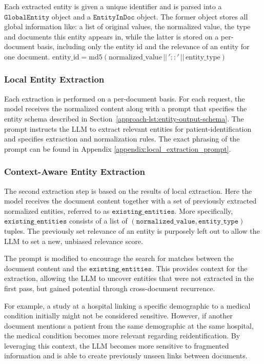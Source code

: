 Each extracted entity is given a unique identifier and is parsed into a $\texttt{GlobalEntity}$ object and a $\texttt{EntityInDoc}$ object. The former object stores all global information like: a list of original values, the normalized value, the type and documents this entity appears in, while the latter is stored on a per-document basis, including only the entity id and the relevance of an entity for one document.
\(\text{entity\_id} = \text{md5}(\text{normalized\_value} \,||\, '::' \,||\, \text{entity\_type})\)


\subsubsection{Local Entity Extraction}
Each extraction is performed on a per-document basis. For each request, the model receives the normalized content along with a prompt that specifies the entity schema described in Section~\ref{approach-lst:entity-output-schema}. The prompt instructs the LLM to extract relevant entities for patient-identification and specifies extraction and normalization rules. The exact phrasing of the prompt can be found in Appendix \ref{appendix:local_extraction_prompt}.


\subsubsection{Context-Aware Entity Extraction}\label{approach-subsubsec:context_extract}
The second extraction step is based on the results of local extraction. Here the model receives the document content together with a set of previously extracted normalized entities, referred to as $\texttt{existing\_entities}$. More specifically, $\texttt{existing\_entities}$ consists of a list of $(\texttt{normalized\_value}, \texttt{entity\_type})$ tuples. The previously set relevance of an entity is purposely left out to allow the LLM to set a new, unbiased relevance score.

The prompt is modified to encourage the search for matches between the document content and the $\texttt{existing\_entities}$. This provides context for the extraction, allowing the LLM to uncover entities that were not extracted in the first pass, but gained potential through cross-document recurrence.

For example, a study at a hospital linking a specific demographic to a medical condition initially might not be considered sensitive. However, if another document mentions a patient from the same demographic at the same hospital, the medical condition becomes more relevant regarding reidentification. By leveraging this context, the LLM becomes more sensitive to fragmented information and is able to create previously unseen links between documents. %


